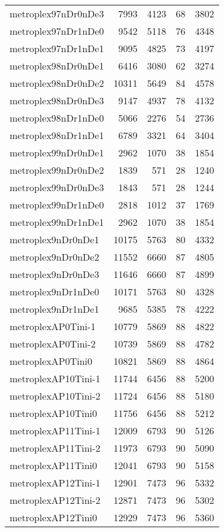 \begin{longtable}{lrrrr}
metroplex97nDr0nDe3 & 7993 & 4123 & 68 & 3802 \\
metroplex97nDr1nDe0 & 9542 & 5118 & 76 & 4348 \\
metroplex97nDr1nDe1 & 9095 & 4825 & 73 & 4197 \\
metroplex98nDr0nDe1 & 6416 & 3080 & 62 & 3274 \\
metroplex98nDr0nDe2 & 10311 & 5649 & 84 & 4578 \\
metroplex98nDr0nDe3 & 9147 & 4937 & 78 & 4132 \\
metroplex98nDr1nDe0 & 5066 & 2276 & 54 & 2736 \\
metroplex98nDr1nDe1 & 6789 & 3321 & 64 & 3404 \\
metroplex99nDr0nDe1 & 2962 & 1070 & 38 & 1854 \\
metroplex99nDr0nDe2 & 1839 & 571 & 28 & 1240 \\
metroplex99nDr0nDe3 & 1843 & 571 & 28 & 1244 \\
metroplex99nDr1nDe0 & 2818 & 1012 & 37 & 1769 \\
metroplex99nDr1nDe1 & 2962 & 1070 & 38 & 1854 \\
metroplex9nDr0nDe1 & 10175 & 5763 & 80 & 4332 \\
metroplex9nDr0nDe2 & 11552 & 6660 & 87 & 4805 \\
metroplex9nDr0nDe3 & 11646 & 6660 & 87 & 4899 \\
metroplex9nDr1nDe0 & 10171 & 5763 & 80 & 4328 \\
metroplex9nDr1nDe1 & 9685 & 5385 & 78 & 4222 \\
metroplexAP0Tini-1 & 10779 & 5869 & 88 & 4822 \\
metroplexAP0Tini-2 & 10739 & 5869 & 88 & 4782 \\
metroplexAP0Tini0 & 10821 & 5869 & 88 & 4864 \\
metroplexAP10Tini-1 & 11744 & 6456 & 88 & 5200 \\
metroplexAP10Tini-2 & 11724 & 6456 & 88 & 5180 \\
metroplexAP10Tini0 & 11756 & 6456 & 88 & 5212 \\
metroplexAP11Tini-1 & 12009 & 6793 & 90 & 5126 \\
metroplexAP11Tini-2 & 11973 & 6793 & 90 & 5090 \\
metroplexAP11Tini0 & 12041 & 6793 & 90 & 5158 \\
metroplexAP12Tini-1 & 12901 & 7473 & 96 & 5332 \\
metroplexAP12Tini-2 & 12871 & 7473 & 96 & 5302 \\
metroplexAP12Tini0 & 12929 & 7473 & 96 & 5360 \\

\end{longtable}
